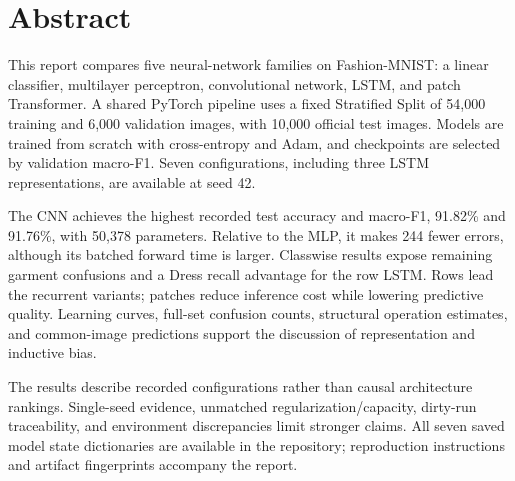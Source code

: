 \section*{Abstract}

This report compares five neural-network families on Fashion-MNIST: a linear classifier, multilayer perceptron, convolutional network, LSTM, and patch Transformer. A shared PyTorch pipeline uses a fixed Stratified Split of 54,000 training and 6,000 validation images, with 10,000 official test images. Models are trained from scratch with cross-entropy and Adam, and checkpoints are selected by validation macro-F1. Seven configurations, including three LSTM representations, are available at seed 42.

The CNN achieves the highest recorded test accuracy and macro-F1, 91.82\% and 91.76\%, with 50,378 parameters. Relative to the MLP, it makes 244 fewer errors, although its batched forward time is larger. Classwise results expose remaining garment confusions and a Dress recall advantage for the row LSTM. Rows lead the recurrent variants; patches reduce inference cost while lowering predictive quality. Learning curves, full-set confusion counts, structural operation estimates, and common-image predictions support the discussion of representation and inductive bias.

The results describe recorded configurations rather than causal architecture rankings. Single-seed evidence, unmatched regularization/capacity, dirty-run traceability, and environment discrepancies limit stronger claims. All seven saved model state dictionaries are available in the repository; reproduction instructions and artifact fingerprints accompany the report.
